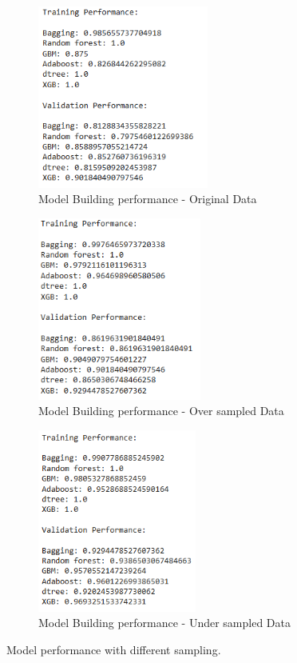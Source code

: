 \documentclass[10pt,a4paper]{style}
\begin{document}
	\begin{figure}[h]
		\centering
		\begin{subfigure}[t]{0.32\textwidth}
			\centering
			\includegraphics[width=\textwidth,height=6cm]{Model Building - Original Data.png}
			\caption{Model Building performance - Original Data}
			\label{fig:Model Building - Original Data}
		\end{subfigure}
		\hfill
		\begin{subfigure}[t]{0.32\textwidth}
			\centering
			\includegraphics[width=\textwidth,height=6cm]{Model Building - Oversampled Data.png}
			\caption{Model Building performance - Over sampled Data}
			\label{fig:Model Building - Oversampled Data}
		\end{subfigure}
		\hfill
		\begin{subfigure}[t]{0.32\textwidth}
			\centering
			\includegraphics[width=\textwidth,height=6cm]{Model Building - Undersampled Data.png}
			\caption{Model Building performance - Under sampled Data}
			\label{fig:Model Building - Undersampled Data}
		\end{subfigure}
		\caption{Model performance with different sampling.}
		\label{fig:Model performance with different sampling}
	\end{figure}
\end{document}

